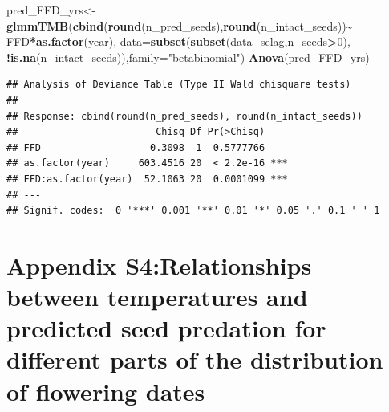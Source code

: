 \documentclass[
]{article}
\newenvironment{Shaded}{\begin{snugshade}}{\end{snugshade}}
\newcommand{\DataTypeTok}[1]{\textcolor[rgb]{0.13,0.29,0.53}{#1}}
\newcommand{\DecValTok}[1]{\textcolor[rgb]{0.00,0.00,0.81}{#1}}
\newcommand{\FloatTok}[1]{\textcolor[rgb]{0.00,0.00,0.81}{#1}}
\newcommand{\KeywordTok}[1]{\textcolor[rgb]{0.13,0.29,0.53}{\textbf{#1}}}
\newcommand{\NormalTok}[1]{#1}
\newcommand{\OperatorTok}[1]{\textcolor[rgb]{0.81,0.36,0.00}{\textbf{#1}}}
\newcommand{\StringTok}[1]{\textcolor[rgb]{0.31,0.60,0.02}{#1}}
\begin{document}
\begin{Shaded}
\begin{Highlighting}[]
\NormalTok{pred\_FFD\_yrs\textless{}{-}}\KeywordTok{glmmTMB}\NormalTok{(}\KeywordTok{cbind}\NormalTok{(}\KeywordTok{round}\NormalTok{(n\_pred\_seeds),}\KeywordTok{round}\NormalTok{(n\_intact\_seeds))}\OperatorTok{\textasciitilde{}}
\StringTok{                        }\NormalTok{FFD}\OperatorTok{*}\KeywordTok{as.factor}\NormalTok{(year),}
                      \DataTypeTok{data=}\KeywordTok{subset}\NormalTok{(}\KeywordTok{subset}\NormalTok{(data\_selag,n\_seeds}\OperatorTok{\textgreater{}}\DecValTok{0}\NormalTok{),}
                                  \OperatorTok{!}\KeywordTok{is.na}\NormalTok{(n\_intact\_seeds)),}\DataTypeTok{family=}\StringTok{"betabinomial"}\NormalTok{)}
\KeywordTok{Anova}\NormalTok{(pred\_FFD\_yrs)}
\end{Highlighting}
\end{Shaded}

\begin{verbatim}
## Analysis of Deviance Table (Type II Wald chisquare tests)
## 
## Response: cbind(round(n_pred_seeds), round(n_intact_seeds))
##                        Chisq Df Pr(>Chisq)    
## FFD                   0.3098  1  0.5777766    
## as.factor(year)     603.4516 20  < 2.2e-16 ***
## FFD:as.factor(year)  52.1063 20  0.0001099 ***
## ---
## Signif. codes:  0 '***' 0.001 '**' 0.01 '*' 0.05 '.' 0.1 ' ' 1
\end{verbatim}

\hypertarget{appendix-s4relationships-between-temperatures-and-predicted-seed-predation-for-different-parts-of-the-distribution-of-flowering-dates}{%
\section{Appendix S4:Relationships between temperatures and predicted
seed predation for different parts of the distribution of flowering
dates}\label{appendix-s4relationships-between-temperatures-and-predicted-seed-predation-for-different-parts-of-the-distribution-of-flowering-dates}}

\begin{Shaded}
\end{Shaded}
\end{document}
